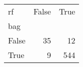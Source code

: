 \begin{tabular}{lrr}
\toprule
rf &  False &  True  \\
bag   &        &        \\
\midrule
False &     35 &     12 \\
True  &      9 &    544 \\
\bottomrule
\end{tabular}
